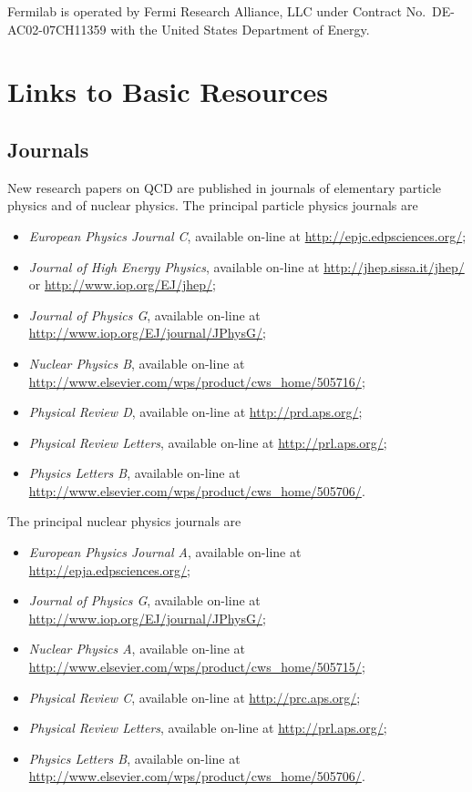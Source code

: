 \documentclass[prb,groupedaddress,nofootinbib,showpacs,twocolumn,floatfix]{revtex4}
\begin{document}
Fermilab is operated by Fermi Research Alliance, LLC  under Contract
No.~DE-AC02-07CH11359 with the United States Department of Energy.  

\appendix

\section{Links to Basic Resources}
\label{app:links}

\subsection{Journals}
New research papers on QCD are published in journals of elementary 
particle physics and of nuclear physics.
The principal particle physics journals are
\begin{itemize}
	\item \emph{European Physics Journal C}, available on-line at 
	\url{http://epjc.edpsciences.org/};
	\item \emph{Journal of High Energy Physics}, available on-line at 
	\url{http://jhep.sissa.it/jhep/} or 
	\url{http://www.iop.org/EJ/jhep/};
	\item \emph{Journal of Physics G}, available on-line at 
	\url{http://www.iop.org/EJ/journal/JPhysG/};
	\item \emph{Nuclear Physics B}, available on-line at 
	\url{http://www.elsevier.com/wps/product/cws_home/505716/};
	\item \emph{Physical Review D}, available on-line at 
	\url{http://prd.aps.org/};
	\item \emph{Physical Review Letters}, available on-line at 
	\url{http://prl.aps.org/};
	\item \emph{Physics Letters B}, available on-line at 
	\url{http://www.elsevier.com/wps/product/cws_home/505706/}.
\end{itemize}
The principal nuclear physics journals are
\begin{itemize}
	\item \emph{European Physics Journal A}, available on-line at 
	\url{http://epja.edpsciences.org/};
	\item \emph{Journal of Physics G}, available on-line at 
	\url{http://www.iop.org/EJ/journal/JPhysG/};
	\item \emph{Nuclear Physics A}, available on-line at 
	\url{http://www.elsevier.com/wps/product/cws_home/505715/};
	\item \emph{Physical Review C}, available on-line at 
	\url{http://prc.aps.org/};
	\item \emph{Physical Review Letters}, available on-line at 
	\url{http://prl.aps.org/};
	\item \emph{Physics Letters B}, available on-line at 
	\url{http://www.elsevier.com/wps/product/cws_home/505706/}.
\end{itemize}
\end{document}
